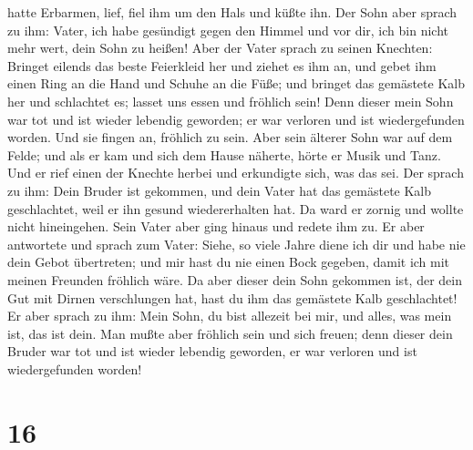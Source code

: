 hatte Erbarmen, lief, fiel ihm um den Hals und küßte ihn.
 Der Sohn aber sprach zu ihm: Vater, ich habe gesündigt
gegen den Himmel und vor dir, ich bin nicht mehr wert, dein Sohn zu
heißen!  Aber der Vater sprach zu seinen Knechten:
Bringet eilends das beste Feierkleid her und ziehet es ihm an, und gebet
ihm einen Ring an die Hand und Schuhe an die Füße;  und
bringet das gemästete Kalb her und schlachtet es; lasset uns essen und
fröhlich sein!  Denn dieser mein Sohn war tot und ist
wieder lebendig geworden; er war verloren und ist wiedergefunden worden.
Und sie fingen an, fröhlich zu sein.  Aber sein älterer
Sohn war auf dem Felde; und als er kam und sich dem Hause näherte, hörte
er Musik und Tanz.  Und er rief einen der Knechte herbei
und erkundigte sich, was das sei.  Der sprach zu ihm:
Dein Bruder ist gekommen, und dein Vater hat das gemästete Kalb
geschlachtet, weil er ihn gesund wiedererhalten hat.  Da
ward er zornig und wollte nicht hineingehen. Sein Vater aber ging hinaus
und redete ihm zu.  Er aber antwortete und sprach zum
Vater: Siehe, so viele Jahre diene ich dir und habe nie dein Gebot
übertreten; und mir hast du nie einen Bock gegeben, damit ich mit meinen
Freunden fröhlich wäre.  Da aber dieser dein Sohn
gekommen ist, der dein Gut mit Dirnen verschlungen hat, hast du ihm das
gemästete Kalb geschlachtet!  Er aber sprach zu ihm: Mein
Sohn, du bist allezeit bei mir, und alles, was mein ist, das ist dein.
 Man mußte aber fröhlich sein und sich freuen; denn
dieser dein Bruder war tot und ist wieder lebendig geworden, er war
verloren und ist wiedergefunden worden!

\hypertarget{section-15}{%
\section{16}\label{section-15}}

